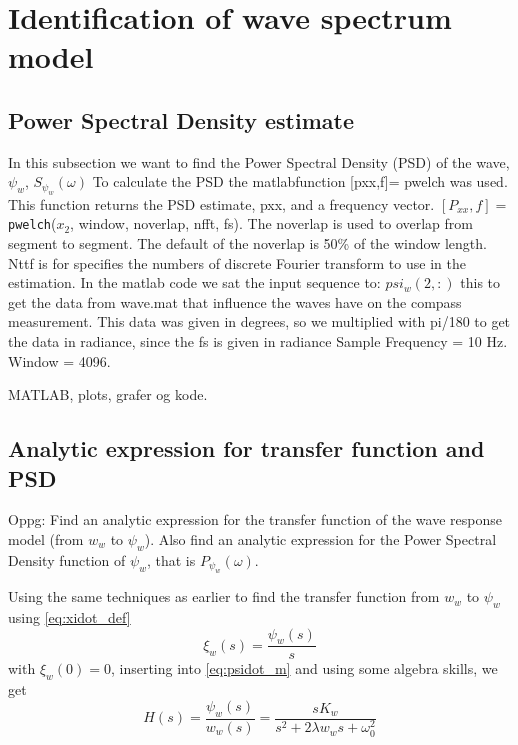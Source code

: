 
\section{Identification of wave spectrum model} \label{sec:part2}

\subsection{Power Spectral Density estimate}
In this subsection we want to find the Power Spectral Density (PSD) of the wave,$\psi_w$, $S_{\psi_w}(\omega)$
\newline
To calculate the PSD the matlabfunction [pxx,f]= pwelch was used. This function returns the PSD estimate, pxx, and a frequency vector. 
 $[P_{xx} , f] = $\texttt{pwelch}($x_2$, window, noverlap, nfft, fs). 
 The noverlap is used to overlap from segment to segment. The default of the noverlap is 50\% of the window length. 
 Nttf is for specifies the numbers of discrete Fourier transform to use in the estimation. 
 In the matlab code we sat the input sequence to: $psi_w(2,:)$ this to get the data from wave.mat that influence the waves have on the compass measurement. This data was given in degrees, so we multiplied with pi/180 to get the data in radiance, since the fs is given in radiance
 Sample Frequency = 10 Hz. Window = 4096. 
\newline

MATLAB, plots, grafer og kode.

\subsection{Analytic expression for transfer function and PSD}
Oppg: Find an analytic expression for the transfer function of the wave response model (from $w_w$ to $\psi_w$). Also find an analytic expression for the Power Spectral Density function of $\psi_w$, that is $P_{\psi_w}(\omega)$.

Using the same techniques as earlier to find the transfer function from $w_w$ to $\psi_w$ using \cref{eq:xidot_def} 
\begin{equation*}
    \xi_w(s) = \frac{\psi_w(s)}{s}
\end{equation*}
with $\xi_w(0) = 0$, inserting into \cref{eq:psidot_m} and using some algebra skills, we get
\begin{equation} 
    H(s) =  \frac{\psi_{w}(s)}{w_{w}(s)} = \frac{s K_w}{s^2 + 2\lambda w_w s + \omega_0^2}
\end{equation}
\bigskip

